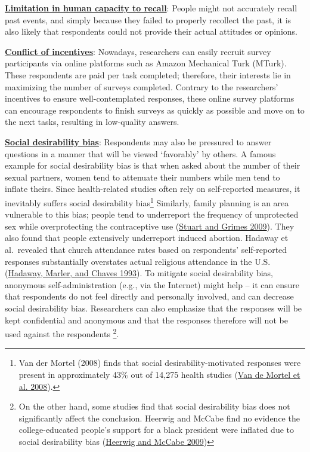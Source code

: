 \documentclass{book}
\begin{document}
\textbf{\uline{Limitation in human capacity to recall}}: People might not
accurately recall past events, and simply because they failed to properly
recollect the past, it is also likely that respondents could not provide their
actual attitudes or opinions.

\textbf{\uline{Conflict of incentives}}: Nowadays, researchers can easily
recruit survey participants via online platforms such as Amazon Mechanical
Turk (MTurk). These respondents are paid per task completed; therefore, their
interests lie in maximizing the number of surveys completed. Contrary to the
researchers' incentives to ensure well-contemplated responses, these online
survey platforms can encourage respondents to finish surveys as quickly as
possible and move on to the next tasks, resulting in low-quality answers.

\textbf{\uline{Social desirability bias}}: Respondents may also be pressured
to answer questions in a manner that will be viewed `favorably' by others. A
famous example for social desirability bias is that when asked about the
number of their sexual partners, women tend to attenuate their numbers while
men tend to inflate theirs. Since health-related studies often rely on
self-reported measures, it inevitably suffers social desirability
bias\footnote{Van der Mortel (2008) finds that social desirability-motivated
  responses were present in approximately 43\% out of 14,275 health studies
  (\protect\hyperlink{ref-van2008faking}{Van de Mortel et al. 2008}).}
Similarly, family planning is an area vulnerable to this bias; people tend to
underreport the frequency of unprotected sex while overprotecting the
contraceptive use (\protect\hyperlink{ref-stuart2009social}{Stuart and Grimes
2009}). They also found that people extensively underreport induced abortion.
Hadaway et al.~revealed that church attendance rates based on respondents'
self-reported responses substantially overstates actual religious attendance
in the U.S. (\protect\hyperlink{ref-hadaway1993polls}{Hadaway, Marler, and
Chaves 1993}). To mitigate social desirability bias, anonymous
self-administration (e.g., via the Internet) might help -- it can ensure that
respondents do not feel directly and personally involved, and can decrease
social desirability bias. Researchers can also emphasize that the responses
will be kept confidential and anonymous and that the responses therefore will
not be used against the respondents \footnote{On the other hand, some studies
  find that social desirability bias does not significantly affect the
  conclusion. Heerwig and McCabe find no evidence the college-educated
  people's support for a black president were inflated due to social
  desirability bias (\protect\hyperlink{ref-heerwig2009education}{Heerwig and
  McCabe 2009})}.
\end{document}
